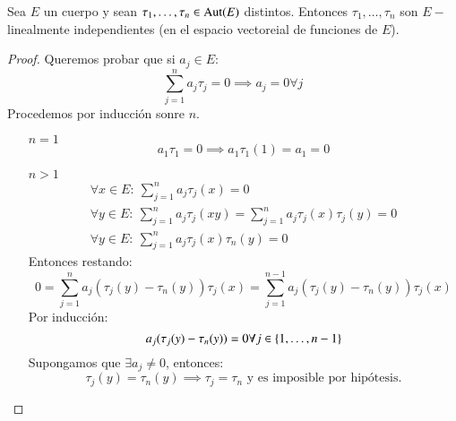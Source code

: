 \begin{thm}[de Dedekind]\label{thm:4.2}
    Sea $E$ un cuerpo y sean $\tau_1, \ldots, \tau_n \in \mathrm{Aut}(E)$ distintos. Entonces $\tau_1, \ldots, \tau_n$ son $E-$linealmente independientes (en el espacio vectoreial de funciones de $E$).
\end{thm}
\begin{proof}
    Queremos probar que si $a_j \in E$:
    $$
        \sum_{j=1}^{n} a_j\tau_j = 0 \implies a_j = 0 \forall j
    $$
    Procedemos por inducción sonre $n$.
    \begin{itemize}
        \item[$n=1$]
        $$
            a_1\tau_1 = 0 \implies a_1\tau_1(1) = a_1 = 0
        $$
        \item[$n>1$]
        \begin{align}
            \forall x  \in E:\ \sum_{j=1}^n a_j\tau_j(x) = 0\\
            \forall y \in E:\ \sum_{j=1}^n a_j\tau_j(xy) = \sum_{j=1}^n a_j\tau_j(x)\tau_j(y) = 0\\
            \forall y \in E:\ \sum_{j=1}^n a_j\tau_j(x)\tau_n(y) = 0
        \end{align}
        Entonces restando:
        $$
            0 = \sum_{j=1}^n a_j(\tau_j(y) - \tau_n(y)) \tau_j(x) = \sum_{j=1}^{n-1} a_j(\tau_j(y)-\tau_n(y))\tau_j(x)
        $$
        Por inducción:
        $$
            a_j(\tau_j(y) - \tau_n(y)) = 0 \forall j \in \left\{1, \ldots, n-1\right\}
        $$
        Supongamos que $\exists a_j \neq 0$, entonces:
        $$
            \tau_j(y) = \tau_n(y) \implies \tau_j = \tau_n \text{ y es imposible por hipótesis.}
        $$
    \end{itemize}
\end{proof}

